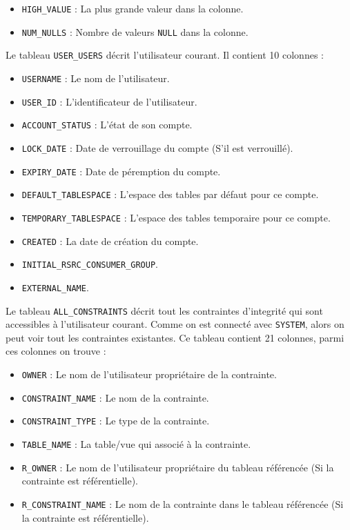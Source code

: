 \documentclass[12pt,a4paper]{article}
\begin{document}
\begin{enumerate}
\begin{itemize}
		\item \texttt{HIGH\_VALUE} : La plus grande valeur dans la colonne.
		\item \texttt{NUM\_NULLS} : Nombre de valeurs \texttt{NULL} dans la colonne.
	\end{itemize}
	Le tableau \texttt{USER\_USERS} décrit l'utilisateur courant. Il contient 10 colonnes :
	\begin{itemize}
		\item \texttt{USERNAME} : Le nom de l'utilisateur.
		\item \texttt{USER\_ID} : L'identificateur de l'utilisateur.
		\item \texttt{ACCOUNT\_STATUS} : L'état de son compte.
		\item \texttt{LOCK\_DATE} : Date de verrouillage du compte (S'il est verrouillé).
		\item \texttt{EXPIRY\_DATE} : Date de péremption du compte.
		\item \texttt{DEFAULT\_TABLESPACE} : L'espace des tables par défaut pour ce compte.
		\item \texttt{TEMPORARY\_TABLESPACE} : L'espace des tables temporaire pour ce compte.
		\item \texttt{CREATED} : La date de création du compte.
		\item \texttt{INITIAL\_RSRC\_CONSUMER\_GROUP}.
		\item \texttt{EXTERNAL\_NAME}.
	\end{itemize}
	Le tableau \texttt{ALL\_CONSTRAINTS} décrit tout les contraintes d'integrité qui sont accessibles à l'utilisateur courant.
	Comme on est connecté avec \texttt{SYSTEM}, alors on peut voir tout les contraintes existantes.
	Ce tableau contient 21 colonnes, parmi ces colonnes on trouve :
	\begin{itemize}
		\item \texttt{OWNER} : Le nom de l'utilisateur propriétaire de la contrainte.
		\item \texttt{CONSTRAINT\_NAME} : Le nom de la contrainte.
		\item \texttt{CONSTRAINT\_TYPE} : Le type de la contrainte.
		\item \texttt{TABLE\_NAME} : La table/vue qui associé à la contrainte.
		\item \texttt{R\_OWNER} : Le nom de l'utilisateur propriétaire du tableau référencée (Si la contrainte est référentielle).
		\item \texttt{R\_CONSTRAINT\_NAME} : Le nom de la contrainte dans le tableau référencée (Si la contrainte est référentielle).

\end{itemize}
\end{enumerate}
\end{document}

